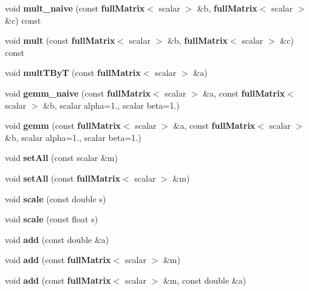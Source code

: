 \begin{DoxyCompactItemize}
\item 
void {\bfseries mult\-\_\-naive} (const {\bf full\-Matrix}$<$ scalar $>$ \&b, {\bf full\-Matrix}$<$ scalar $>$ \&c) const \label{classfullMatrix_a52dc876b1826b5bb3b915daaede088c0}

\item 
void {\bfseries mult} (const {\bf full\-Matrix}$<$ scalar $>$ \&b, {\bf full\-Matrix}$<$ scalar $>$ \&c) const \label{classfullMatrix_a116826053c8db3494a0d1739bfdb027b}

\item 
void {\bfseries mult\-T\-By\-T} (const {\bf full\-Matrix}$<$ scalar $>$ \&a)\label{classfullMatrix_a96479776cf19dd78df0d701b4825faaa}

\item 
void {\bfseries gemm\-\_\-naive} (const {\bf full\-Matrix}$<$ scalar $>$ \&a, const {\bf full\-Matrix}$<$ scalar $>$ \&b, scalar alpha=1., scalar beta=1.)\label{classfullMatrix_aa1bdd6eeedfe97d327e83ce143a7b5f7}

\item 
void {\bfseries gemm} (const {\bf full\-Matrix}$<$ scalar $>$ \&a, const {\bf full\-Matrix}$<$ scalar $>$ \&b, scalar alpha=1., scalar beta=1.)\label{classfullMatrix_a2d899ddb35639676a5950f8aa3ab9feb}

\item 
void {\bfseries set\-All} (const scalar \&m)\label{classfullMatrix_a4c6d321804e56eaf3e06247ba95790ea}

\item 
void {\bfseries set\-All} (const {\bf full\-Matrix}$<$ scalar $>$ \&m)\label{classfullMatrix_a3160001559cfd931475e64fbede5c2ac}

\item 
void {\bfseries scale} (const double s)\label{classfullMatrix_a5fe48868291f6f4ff9f7d3ce773e7ff1}

\item 
void {\bfseries scale} (const float s)\label{classfullMatrix_a5c8896026548f0d79e44c294092da9c2}

\item 
void {\bfseries add} (const double \&a)\label{classfullMatrix_a9b1e033679715bedb2cfe8916e34114f}

\item 
void {\bfseries add} (const {\bf full\-Matrix}$<$ scalar $>$ \&m)\label{classfullMatrix_a0bbbce0cad2f89982099ce3854594a99}

\item 
void {\bfseries add} (const {\bf full\-Matrix}$<$ scalar $>$ \&m, const double \&a)\label{classfullMatrix_ac87653d1c39ab6f945f7f23701512e4d}


\end{DoxyCompactItemize}
